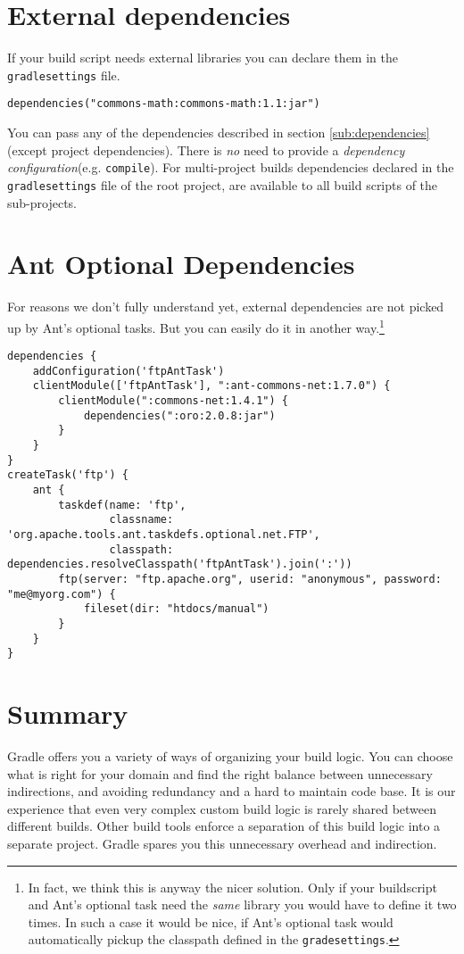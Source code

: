 \section{External dependencies} %
\label{sec:external_dependencies}
If your build script needs external libraries you can declare them in the \texttt{gradlesettings} file. 
\begin{Verbatim}[label=gradlesettings]
dependencies("commons-math:commons-math:1.1:jar")	
\end{Verbatim}
You can pass any of the dependencies described in section \ref{sub:dependencies} (except project dependencies). There is \emph{no} need to provide a \emph{dependency configuration}(e.g. \texttt{compile}). For multi-project builds dependencies declared in the \texttt{gradlesettings} file of the root project, are available to all build scripts of the sub-projects.

\section{Ant Optional Dependencies} %
\label{sec:ant_optional_dependencies}
For reasons we don't fully understand yet, external dependencies are not picked up by Ant's optional tasks. But you can easily do it in another way.\footnote{In fact, we think this is anyway the nicer solution. Only if your buildscript and Ant's optional task need the \emph{same} library you would have to define it two times. In such a case it would be nice, if Ant's optional task would automatically pickup the classpath defined in the \texttt{gradesettings}.}  
\begin{Verbatim}[label=gradlesettings]
dependencies {
    addConfiguration('ftpAntTask')
    clientModule(['ftpAntTask'], ":ant-commons-net:1.7.0") {
        clientModule(":commons-net:1.4.1") {
            dependencies(":oro:2.0.8:jar")
        }
    }
}
createTask('ftp') {
    ant {
        taskdef(name: 'ftp',
                classname: 'org.apache.tools.ant.taskdefs.optional.net.FTP',
                classpath: dependencies.resolveClasspath('ftpAntTask').join(':'))
        ftp(server: "ftp.apache.org", userid: "anonymous", password: "me@myorg.com") {
            fileset(dir: "htdocs/manual")
        }
    }
}
\end{Verbatim}

\section{Summary} %
\label{sec:philosophy}
Gradle offers you a variety of ways of organizing your build logic. You can choose what is right for your domain and find the right balance between unnecessary indirections, and avoiding redundancy and a hard to maintain code base. 
It is our experience that even very complex custom build logic is rarely shared between different builds. Other build tools enforce a separation of this build logic into a separate project. Gradle spares you this unnecessary overhead and indirection.


